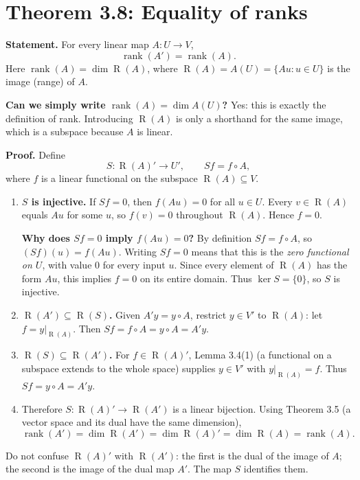 \documentclass[11pt,a4paper]{article}
\newcommand{\rank}{\operatorname{rank}}
\newcommand{\Ran}{\operatorname{R}}
\newenvironment{proofsteps}{\begin{enumerate}\setlength{\itemsep}{4pt}}{\end{enumerate}}
\begin{document}
\section{Theorem 3.8: Equality of ranks}
\textbf{Statement.} For every linear map \(A:U\to V\),
\[
 \boxed{\rank(A')=\rank(A).}
\]
Here \(\rank(A)=\dim\Ran(A)\), where \(\Ran(A)=A(U)=\{Au:u\in U\}\) is the image (range) of \(A\).
\begin{personalnote}
\textbf{Can we simply write \(\operatorname{rank}(A)=\dim A(U)\)?} Yes: this is exactly the definition of rank. Introducing \(\Ran(A)\) is only a shorthand for the same image, which is a subspace because \(A\) is linear.
\end{personalnote}

\textbf{Proof.} Define
\[
 S:\Ran(A)'\longrightarrow U',\qquad Sf=f\circ A,
\]
where \(f\) is a linear functional on the subspace \(\Ran(A)\subseteq V\).
\begin{proofsteps}
\item \textbf{\(S\) is injective.} If \(Sf=0\), then \(f(Au)=0\) for all \(u\in U\). Every \(v\in\Ran(A)\) equals \(Au\) for some \(u\), so \(f(v)=0\) throughout \(\Ran(A)\). Hence \(f=0\).
\begin{personalnote}
\textbf{Why does \(Sf=0\) imply \(f(Au)=0\)?} By definition \(Sf=f\circ A\), so \((Sf)(u)=f(Au)\). Writing \(Sf=0\) means that this is the \emph{zero functional on \(U\)}, with value \(0\) for every input \(u\). Since every element of \(\Ran(A)\) has the form \(Au\), this implies \(f=0\) on its entire domain. Thus \(\ker S=\{0\}\), so \(S\) is injective.
\end{personalnote}
\item \textbf{\(\Ran(A')\subseteq\Ran(S)\).} Given \(A'y=y\circ A\), restrict \(y\in V'\) to \(\Ran(A)\): let \(f=y|_{\Ran(A)}\). Then \(Sf=f\circ A=y\circ A=A'y\).
\item \textbf{\(\Ran(S)\subseteq\Ran(A')\).} For \(f\in\Ran(A)'\), Lemma 3.4(1) (a functional on a subspace extends to the whole space) supplies \(y\in V'\) with \(y|_{\Ran(A)}=f\). Thus \(Sf=y\circ A=A'y\).
\item Therefore \(S:\Ran(A)'\to\Ran(A')\) is a linear bijection. Using Theorem 3.5 (a vector space and its dual have the same dimension),
\[
 \rank(A')=\dim\Ran(A')=\dim\Ran(A)'=\dim\Ran(A)=\rank(A).
\]
\end{proofsteps}
\begin{personalnote}
Do not confuse \(\Ran(A)'\) with \(\Ran(A')\): the first is the dual of the image of \(A\); the second is the image of the dual map \(A'\). The map \(S\) identifies them.
\end{personalnote}
\end{document}
